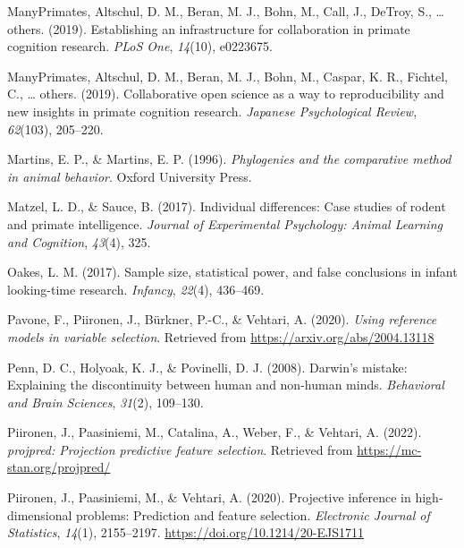 \documentclass[
  man,floatsintext]{apa6}
\newlength{\cslhangindent}
\newlength{\cslentryspacingunit} %
\newenvironment{CSLReferences}[2] %
 {%
  \setlength{\parindent}{0pt}
  \ifodd #1
  \let\oldpar\par
  \def\par{\hangindent=\cslhangindent\oldpar}
  \fi
  \setlength{\parskip}{#2\cslentryspacingunit}
 }%
 {}
\begin{document}
\begin{CSLReferences}{1}{0}
\leavevmode{}%
ManyPrimates, Altschul, D. M., Beran, M. J., Bohn, M., Call, J., DeTroy, S., \ldots{} others. (2019). Establishing an infrastructure for collaboration in primate cognition research. \emph{PLoS One}, \emph{14}(10), e0223675.

\leavevmode{}%
ManyPrimates, Altschul, D. M., Beran, M. J., Bohn, M., Caspar, K. R., Fichtel, C., \ldots{} others. (2019). Collaborative open science as a way to reproducibility and new insights in primate cognition research. \emph{Japanese Psychological Review}, \emph{62}(103), 205--220.

\leavevmode{}%
Martins, E. P., \& Martins, E. P. (1996). \emph{Phylogenies and the comparative method in animal behavior}. Oxford University Press.

\leavevmode{}%
Matzel, L. D., \& Sauce, B. (2017). Individual differences: Case studies of rodent and primate intelligence. \emph{Journal of Experimental Psychology: Animal Learning and Cognition}, \emph{43}(4), 325.

\leavevmode{}%
Oakes, L. M. (2017). Sample size, statistical power, and false conclusions in infant looking-time research. \emph{Infancy}, \emph{22}(4), 436--469.

\leavevmode{}%
Pavone, F., Piironen, J., Bürkner, P.-C., \& Vehtari, A. (2020). \emph{Using reference models in variable selection}. Retrieved from \url{https://arxiv.org/abs/2004.13118}

\leavevmode{}%
Penn, D. C., Holyoak, K. J., \& Povinelli, D. J. (2008). Darwin's mistake: Explaining the discontinuity between human and non-human minds. \emph{Behavioral and Brain Sciences}, \emph{31}(2), 109--130.

\leavevmode{}%
Piironen, J., Paasiniemi, M., Catalina, A., Weber, F., \& Vehtari, A. (2022). \emph{{projpred}: Projection predictive feature selection}. Retrieved from \url{https://mc-stan.org/projpred/}

\leavevmode{}%
Piironen, J., Paasiniemi, M., \& Vehtari, A. (2020). {Projective inference in high-dimensional problems: Prediction and feature selection}. \emph{Electronic Journal of Statistics}, \emph{14}(1), 2155--2197. \url{https://doi.org/10.1214/20-EJS1711}


\end{CSLReferences}
\end{document}
